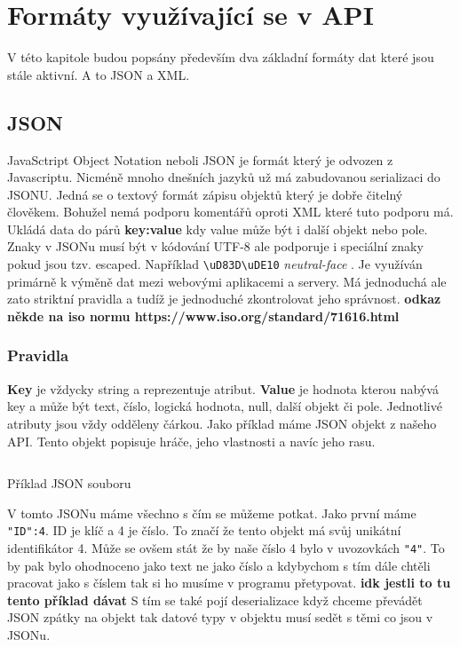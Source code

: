 \chapter{Formáty využívající se v API}
V této kapitole budou popsány především dva základní formáty dat které jsou stále aktivní. A to JSON a XML.

\section{JSON}
JavaSctript Object Notation neboli JSON je formát který je odvozen z Javascriptu. Nicméně mnoho dnešních jazyků už má zabudovanou serializaci do JSONU. Jedná se o textový formát zápisu objektů který je dobře čitelný člověkem. Bohužel nemá podporu komentářů oproti XML které tuto podporu má. Ukládá data do párů \textbf{key:value} kdy value může být i další objekt nebo pole. Znaky v JSONu musí být v kódování UTF-8 ale podporuje i speciální znaky pokud jsou tzv. escaped. Například \verb |\uD83D\uDE10| \textit{neutral-face} . Je využíván primárně k výměně dat mezi webovými aplikacemi a  servery. Má jednoduchá ale zato striktní pravidla a tudíž je jednoduché zkontrolovat jeho správnost. \textbf{odkaz někde na iso normu https://www.iso.org/standard/71616.html} %


\subsection{Pravidla}
\textbf{Key} je vždycky string a reprezentuje atribut. \textbf{Value} je hodnota kterou nabývá key a může být text, číslo, logická hodnota, null, další objekt či pole. Jednotlivé atributy jsou vždy odděleny čárkou. Jako příklad máme JSON objekt z našeho API. Tento objekt popisuje hráče, jeho vlastnosti a navíc jeho rasu.

\newpage

\begin{listing}
  \inputminted{json}{resources/code/standards/player.json}
  \caption{Příklad JSON souboru}
  \label{code:json_player}
\end{listing}

V tomto JSONu máme všechno s čím se můžeme potkat. Jako první máme \verb|"ID":4|. ID je klíč a 4 je číslo. To značí že tento objekt má svůj unikátní identifikátor 4. Může se ovšem stát že by naše číslo 4 bylo v uvozovkách \verb|"4"|. To by pak bylo ohodnoceno jako text ne jako číslo a kdybychom s tím dále chtěli pracovat jako s číslem tak si ho musíme v programu přetypovat. \textbf{idk jestli to tu tento příklad dávat } S tím se také pojí deserializace když chceme převádět JSON zpátky na objekt tak datové typy v objektu musí sedět s těmi co jsou v JSONu.

